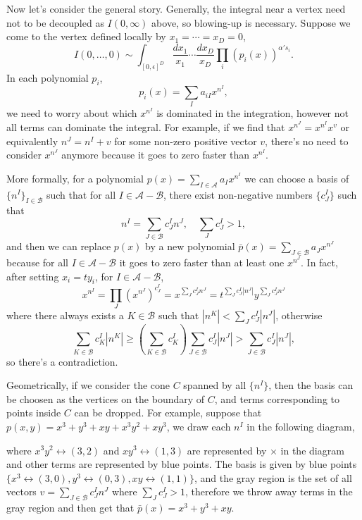 \documentclass[12pt]{article}
\theoremstyle{definition}
\theoremstyle{plain}
\begin{document}
Now let's consider the general story. Generally, the integral near a vertex need not to be decoupled as $I(0,\infty)$ above, so blowing-up is necessary. Suppose we come to the vertex defined locally by $x_1=\cdots=x_D=0$, 
\[
	I(0,\dots,0)\sim \int_{[0,\epsilon]^D} \frac{d x_1}{x_1}\cdots \frac{d x_D}{x_D} \prod_i(p_i(x))^{\alpha' s_i}.
\]
In each polynomial $p_i$, 
\[
	p_i(x)=\sum_{I} a_{iI} x^{n^I},
\]
we need to worry about which $x^{n^I}$ is dominated in the integration, however not all terms can  dominate the integral. For example, if we find that $x^{n^J}=x^{n^I}x^{v}$ or equivalently $n^J=n^I+v$ for some non-zero positive vector $v$, there's no need to consider $x^{n^J}$ anymore because it goes to zero faster than $x^{n^I}$. 

More formally, for a polynomial $p(x)=\sum_{I\in \mathscr A}a_I x^{n^I}$ we can choose a basis of $\{n^I\}_{I\in \mathscr B}$ such that for all $I \in \mathscr A-\mathscr B$, there exist non-negative numbers $\{c^I_J\}$ such that
\[
	n^I = \sum_{J\in \mathscr B}c^I_J n^J,\quad \sum_J c^I_J>  1,
\]
and then we can replace $p(x)$ by a new polynomial $\bar p(x)=\sum_{J\in \mathscr B}a_J x^{n^J}$ because for all $I \in \mathscr A-\mathscr B$ it goes to zero faster than at least one $x^{n^J}$. In fact, after setting $x_i=t y_i$, for $I \in \mathscr A-\mathscr B$, 
\[
	x^{n^I}=\prod_J (x^{n^J})^{c^I_J}=x^{\sum_J c^I_J n^J} = t^{\sum_J c^I_J |n^J|}y^{\sum_J c^I_J n^J}
\]
where there always exists a $K\in \mathscr B$ such that $|n^K|<\sum_J c^I_J |n^J|$, otherwise
\[
	\sum_{K\in \mathscr B} c^I_K|n^K|\geq \left(\sum_{K\in \mathscr B} c^I_K\right)\sum_{J\in \mathscr B} c^I_J |n^J|>\sum_{J\in \mathscr B} c^I_J |n^J|,
\]
so there's a contradiction.

Geometrically, if we consider the cone $C$ spanned by all $\{n^I\}$, then the basis can be choosen as the vertices on the boundary of $C$, and terms corresponding to points inside $C$ can be dropped.
For example, suppose that $p(x,y)=x^3+y^3+xy+x^3y^2+xy^3$, we draw each $n^I$ in the following diagram,
\begin{center}
\end{center}
where $x^3y^2\leftrightarrow (3,2)$ and $xy^3\leftrightarrow (1,3)$ are represented by $\times$ in the diagram and other terms are represented by blue points. The basis is given by blue points $\{x^3\leftrightarrow (3,0),y^3\leftrightarrow (0,3),xy\leftrightarrow (1,1)\}$, and the gray region is the set of all vectors $v=\sum_{J\in \mathscr B}c^I_J n^J$ where $\sum_J c^I_J>1$, therefore we throw away terms in the gray region and then get that $\bar p(x)=x^3+y^3+xy$. 
\end{document}
